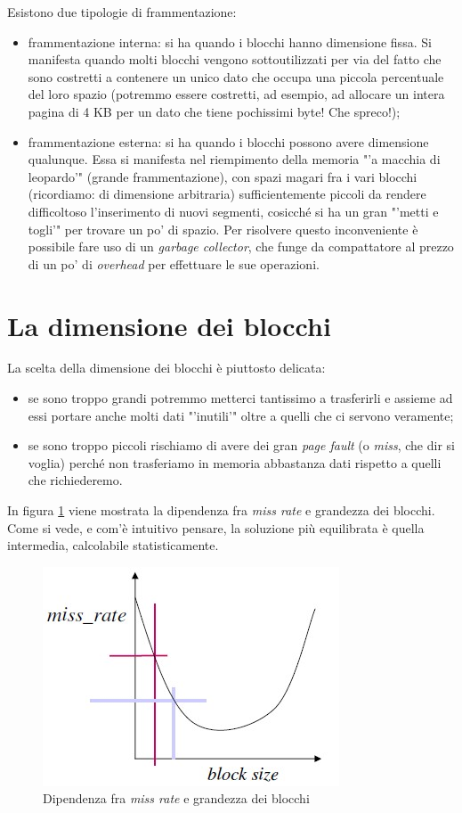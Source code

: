 Esistono due tipologie di frammentazione:
\begin{itemize}
\item frammentazione interna: si ha quando i blocchi hanno dimensione fissa. Si manifesta quando molti blocchi vengono sottoutilizzati per via del fatto che sono costretti a contenere un unico dato che occupa una piccola percentuale del loro spazio (potremmo essere costretti, ad esempio, ad allocare un intera pagina di 4 KB per un dato che tiene pochissimi byte! Che spreco!);
\item frammentazione esterna: si ha quando i blocchi possono avere dimensione qualunque. Essa si manifesta nel riempimento della memoria "'a macchia di leopardo'" (grande frammentazione), con spazi magari fra i vari blocchi (ricordiamo: di dimensione arbitraria) sufficientemente piccoli da rendere difficoltoso l'inserimento di nuovi segmenti, cosicché si ha un gran "'metti e togli'" per trovare un po' di spazio. Per risolvere questo inconveniente è possibile fare uso di un \textit{garbage collector}, che funge da compattatore al prezzo di un po' di \textit{overhead} per effettuare le sue operazioni.
\end{itemize}

\section{La dimensione dei blocchi}
\label{sec:dimensioneBlocchi}

La scelta della dimensione dei blocchi è piuttosto delicata:
\begin{itemize}
\item se sono troppo grandi potremmo metterci tantissimo a trasferirli e assieme ad essi portare anche molti dati "'inutili'" oltre a quelli che ci servono veramente;
\item se sono troppo piccoli rischiamo di avere dei gran \textit{page fault} (o \textit{miss}, che dir si voglia) perché non trasferiamo in memoria abbastanza dati rispetto a quelli che richiederemo.
\end{itemize}
In figura \ref{fig:missrateblocksize} viene mostrata la dipendenza fra \textit{miss rate} e grandezza dei blocchi. Come si vede, e com'è intuitivo pensare, la soluzione più equilibrata è quella intermedia, calcolabile statisticamente.

\begin{figure}[!h]
\centering
\includegraphics[width=0.4\columnwidth]{img/missrateblocksize}
\caption{Dipendenza fra \textit{miss rate} e grandezza dei blocchi}
\label{fig:missrateblocksize}
\end{figure}

